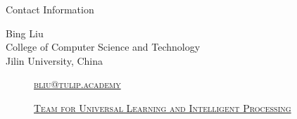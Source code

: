 \documentclass[
 size=14pt,
 paper=smartboard,  %
 mode=present, 		%
 display=slides, 	%
 style=tuliplab,  	%
 pauseslide,
 fleqn,leqno]{powerdot}
\begin{document}
\begin{wideslide}[toc=,bm=]{Contact Information}
\centering
{}
\twocolumn[
lcolwidth=0.35\linewidth,
rcolwidth=0.65\linewidth
]
{
}
{
Bing Liu\\
College of Computer Science and Technology\\
Jilin University, China
\begin{description}
 \item[\textcolor{orange}{\faEnvelope}] \href{mailto:bliu@tulip.academy}
 {\textsc{\footnotesize{bliu@tulip.academy}}}

 \item[\textcolor{orange}{\faHome}] \href{http://www.tulip.org.au}
 {\textsc{\footnotesize{Team for Universal Learning and Intelligent Processing}}}
\end{description}
}
\end{wideslide}
\end{document}
